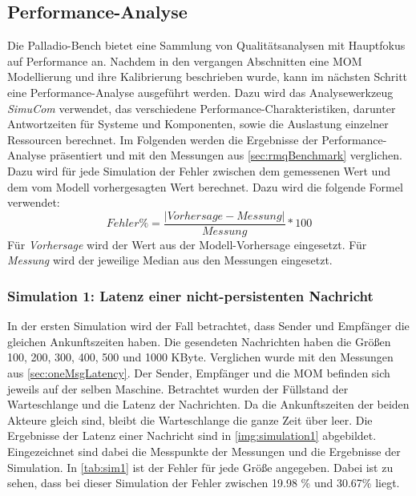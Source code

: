 \subsection{Performance-Analyse}
\label{sec:performanceanalyse}
Die Palladio-Bench bietet eine Sammlung von Qualitätsanalysen mit Hauptfokus auf Performance an. Nachdem in den vergangen Abschnitten eine MOM Modellierung und ihre Kalibrierung beschrieben wurde, kann im nächsten Schritt eine Performance-Analyse ausgeführt werden. Dazu wird das Analysewerkzeug \emph{SimuCom} verwendet, das verschiedene Performance-Charakteristiken, darunter Antwortzeiten für Systeme und Komponenten, sowie die Auslastung einzelner Ressourcen berechnet. Im Folgenden werden die Ergebnisse der Performance-Analyse präsentiert und mit den Messungen aus \autoref{sec:rmqBenchmark} verglichen. Dazu wird für jede Simulation der Fehler zwischen dem gemessenen Wert und dem vom Modell vorhergesagten Wert berechnet. Dazu wird die folgende Formel verwendet: \[ Fehler\% = \frac{|Vorhersage - Messung|}{Messung} * 100 \] Für \textit{Vorhersage} wird der Wert aus der Modell-Vorhersage eingesetzt. Für \textit{Messung} wird der jeweilige Median aus den Messungen eingesetzt.

\subsubsection{Simulation 1: Latenz einer nicht-persistenten Nachricht}
\label{sec:rmqSimulation1}
In der ersten Simulation wird der Fall betrachtet, dass Sender und Empfänger die gleichen Ankunftszeiten haben. Die gesendeten Nachrichten haben die Größen 100, 200, 300, 400, 500 und 1000 KByte. Verglichen wurde mit den Messungen aus \autoref{sec:oneMsgLatency}. Der Sender, Empfänger und die MOM befinden sich jeweils auf der selben Maschine. Betrachtet wurden der Füllstand der Warteschlange und die Latenz der Nachrichten. 
Da die Ankunftszeiten der beiden Akteure gleich sind, bleibt die Warteschlange die ganze Zeit über leer. Die Ergebnisse der Latenz einer Nachricht sind in \autoref{img:simulation1} abgebildet. Eingezeichnet sind dabei die Messpunkte der Messungen und die Ergebnisse der Simulation. In \autoref{tab:sim1} ist der Fehler für jede Größe angegeben. Dabei ist zu sehen, dass bei dieser Simulation der Fehler zwischen 19.98 \% und 30.67\% liegt.

